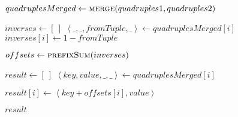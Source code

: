 \begin{frame}[containsverbatim]{\insertionseriesexampleframe}
\begin{columns}[c]
\begin{column}{0.3\textwidth}
{\begin{minipage}[c]{\textwidth}
\begin{algorithm}[H]
\begin{algorithmic}[1]
                                            \label{insertionseriesSortMerge before merge}
                                            \State $quadruplesMerged \gets \Call{merge}{quadruples1, quadruples2}$
                                            \label{insertionseriesSortMerge after merge}
                        
                                            \State $inverses \gets \left[\ \right]$
                                                \State $\left<\_, \_, fromTuple, \_\right> \gets quadruplesMerged{\left[i\right]}$
                                                \State $inverses{\left[i\right]} \gets 1 - fromTuple$
                                            \EndFor
                                            \label{insertionseriesSortMerge after inverses}

                                            \label{insertionseriesSortMerge before prefixSum}
                                            \State $offsets \gets \Call{prefixSum}{inverses}$
                                            \label{insertionseriesSortMerge after prefixSum}
                        
                                            \State $result \gets \left[\ \right]$
                                                \State $\left<key, value, \_, \_\right> \gets quadruplesMerged{\left[i\right]}$
                                                
                                                \State $result{\left[i\right]} \gets \left<key + offsets{\left[i\right]}, value\right>$
                                            \EndFor
                                            \label{insertionseriesSortMerge after fix}
                                            
                                            \State \Return $result$
                                        \EndFunction
                                    \end{algorithmic}
                                \end{algorithm}
                            \endgroup
                        \end{minipage}
                    }
                \end{column}


\end{columns}
\end{frame}
